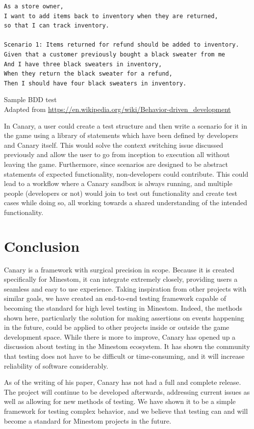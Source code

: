\documentclass[12pt]{article}
\begin{document}
\begin{onehalfspacing}
\begin{listing}[H]
\begin{verbatim}
As a store owner,
I want to add items back to inventory when they are returned,
so that I can track inventory.

Scenario 1: Items returned for refund should be added to inventory.
Given that a customer previously bought a black sweater from me
And I have three black sweaters in inventory,
When they return the black sweater for a refund,
Then I should have four black sweaters in inventory.
\end{verbatim}
\caption{Sample BDD test \\ Adapted from \url{https://en.wikipedia.org/wiki/Behavior-driven_development}
}
\label{lst:5_2_3_1}
\end{listing}

In Canary, a user could create a test structure and then write a
scenario for it in the game using a library of statements which have
been defined by developers and Canary itself. This would solve the
context switching issue discussed previously and allow the user to go
from inception to execution all without leaving the game. Furthermore,
since scenarios are designed to be abstract statements of expected
functionality, non-developers could contribute. This could lead to a
workflow where a Canary sandbox is always running, and multiple people
(developers or not) would join to test out functionality and create test
cases while doing so, all working towards a shared understanding of the
intended functionality.

\newpage
\section{Conclusion}

Canary is a framework with surgical precision in scope. Because it is
created specifically for Minestom, it can integrate extremely closely,
providing users a seamless and easy to use experience. Taking
inspiration from other projects with similar goals, we have created an
end-to-end testing framework capable of becoming the standard for high
level testing in Minestom. Indeed, the methods shown here, particularly
the solution for making assertions on events happening in the future,
could be applied to other projects inside or outside the game
development space. While there is more to improve, Canary has opened up
a discussion about testing in the Minestom ecosystem. It has shown the
community that testing does not have to be difficult or time-consuming,
and it will increase reliability of software considerably.

As of the writing of his paper, Canary has not had a full and complete
release. The project will continue to be developed afterwards,
addressing current issues as well as allowing for new methods of
testing. We have shown it to be a simple framework for testing complex
behavior, and we believe that testing can and will become a standard for
Minestom projects in the future.

\end{onehalfspacing} %
\end{document}
